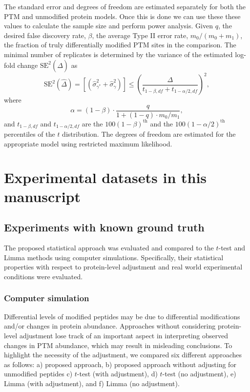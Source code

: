 \documentclass{mcp}
\begin{document}
The standard error and degrees of freedom are estimated separately for both the PTM and unmodified protein models. Once this is done we can use these these values to calculate the sample size and perform power analysis. Given $q$, the desired false discovery rate, $\beta$, the average Type II error rate, $m_0 / (m_0 + m_1)$, the fraction of truly differentially modified PTM sites in the comparison. The minimal number of replicates is determined by the variance of the estimated log-fold change $\mathrm{SE}^{2}(\hat{\Delta})$ as
\[
\mathrm{SE}^{2}(\hat{\Delta}) = \left[ \left( \hat{\sigma}_{\gamma^{\ast}}^{2} + \hat{\sigma}_{\gamma}^{2} \right) \right]
\leq \left( \frac{\Delta}{t_{1-\beta, df} + t_{1-\alpha /2, df}} \right)^{2},
\]
where 
\[
\alpha = (1 - \beta) \cdot \frac{q}{1 + (1-q) \cdot m_0 / m_1},
\]
and $t_{1-\beta, df}$ and $t_{1-\alpha /2, df}$ are the $100(1-\beta)^{\text{th}}$ and the $100(1-\alpha /2)^{\text{th}}$ percentiles of the $t$ distribution. The degrees of freedom are estimated for the appropriate model using restricted maximum likelihood.

\clearpage
\section{Experimental datasets in this manuscript}

\subsection{Experiments with known ground truth}
\label{sec:sim}

The proposed statistical approach was evaluated and compared to the $t$-test and Limma methods using computer simulations. Specifically, their statistical properties with respect to protein-level adjustment and real world experimental conditions were evaluated.


\subsubsection{Computer simulation}

Differential levels of modified peptides may be due to differential modifications and/or changes in protein abundance. Approaches without considering protein-level adjustment lose track of an important aspect in interpreting observed changes in PTM abundance, which may result in misleading conclusions. To highlight the necessity of the adjustment, we compared six different approaches as follows: a) proposed approach, b) proposed approach without adjusting for unmodified peptides c) $t$-test (with adjustment), d) $t$-test (no adjustment), e) Limma (with adjustment), and f) Limma (no adjustment).
\end{document}
